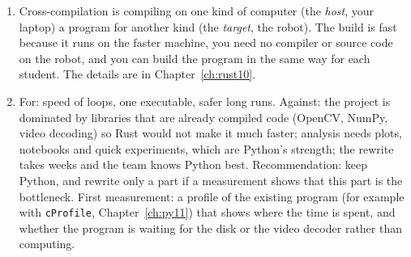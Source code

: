 \begin{enumerate}[label=\textbf{\ansnum.\arabic*}]
  \item Cross-compilation is compiling on one kind of computer (the \emph{host}, your laptop) a program for another kind (the \emph{target}, the robot). The build is fast because it runs on the faster machine, you need no compiler or source code on the robot, and you can build the program in the same way for each student. The details are in Chapter~\ref{ch:rust10}.
  \item[\textbf{\ansnum.10}$\star$] For: speed of loops, one executable, safer long runs. Against: the project is dominated by libraries that are already compiled code (OpenCV, NumPy, video decoding) so Rust would not make it much faster; analysis needs plots, notebooks and quick experiments, which are Python's strength; the rewrite takes weeks and the team knows Python best. Recommendation: keep Python, and rewrite only a part if a measurement shows that this part is the bottleneck. First measurement: a profile of the existing program (for example with \verb!cProfile!, Chapter~\ref{ch:py11}) that shows where the time is spent, and whether the program is waiting for the disk or the video decoder rather than computing.
\end{enumerate}
